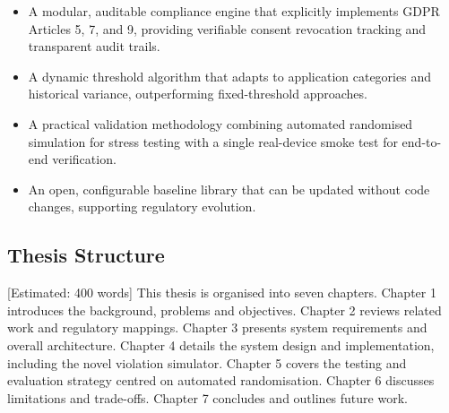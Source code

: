 \begin{itemize}
\item A modular, auditable compliance engine that explicitly implements GDPR Articles 5, 7, and 9, providing verifiable consent revocation tracking and transparent audit trails.
\item A dynamic threshold algorithm that adapts to application categories and historical variance, outperforming fixed-threshold approaches.
\item A practical validation methodology combining automated randomised simulation for stress testing with a single real-device smoke test for end-to-end verification.
\item An open, configurable baseline library that can be updated without code changes, supporting regulatory evolution.
\end{itemize}

\subsection{Thesis Structure} [Estimated: 400 words]
This thesis is organised into seven chapters. Chapter 1 introduces the background, problems and objectives. Chapter 2 reviews related work and regulatory mappings. Chapter 3 presents system requirements and overall architecture. Chapter 4 details the system design and implementation, including the novel violation simulator. Chapter 5 covers the testing and evaluation strategy centred on automated randomisation. Chapter 6 discusses limitations and trade-offs. Chapter 7 concludes and outlines future work.